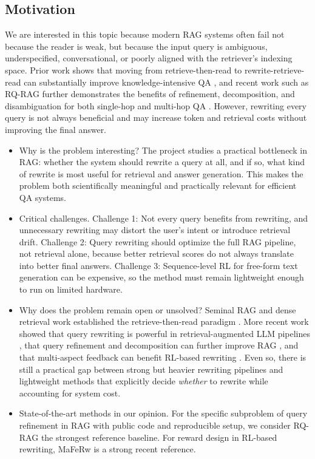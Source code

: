 \subsection{Motivation}
We are interested in this topic because modern RAG systems often fail not because the reader is weak, but because the input query is ambiguous, underspecified, conversational, or poorly aligned with the retriever's indexing space. Prior work shows that moving from retrieve-then-read to rewrite-retrieve-read can substantially improve knowledge-intensive QA \citep{ma-etal-2023-query}, and recent work such as RQ-RAG further demonstrates the benefits of refinement, decomposition, and disambiguation for both single-hop and multi-hop QA \citep{chan2024rqrag}. However, rewriting every query is not always beneficial and may increase token and retrieval costs without improving the final answer.

\begin{itemize}
    \item Why is the problem interesting? The project studies a practical bottleneck in RAG: whether the system should rewrite a query at all, and if so, what kind of rewrite is most useful for retrieval and answer generation. This makes the problem both scientifically meaningful and practically relevant for efficient QA systems.
    \item Critical challenges. Challenge 1: Not every query benefits from rewriting, and unnecessary rewriting may distort the user's intent or introduce retrieval drift. Challenge 2: Query rewriting should optimize the full RAG pipeline, not retrieval alone, because better retrieval scores do not always translate into better final answers. Challenge 3: Sequence-level RL for free-form text generation can be expensive, so the method must remain lightweight enough to run on limited hardware.
    \item Why does the problem remain open or unsolved? Seminal RAG and dense retrieval work established the retrieve-then-read paradigm \citep{lewis2020retrieval,karpukhin-etal-2020-dense}. More recent work showed that query rewriting is powerful in retrieval-augmented LLM pipelines \citep{ma-etal-2023-query}, that query refinement and decomposition can further improve RAG \citep{chan2024rqrag}, and that multi-aspect feedback can benefit RL-based rewriting \citep{wang2024maferw}. Even so, there is still a practical gap between strong but heavier rewriting pipelines and lightweight methods that explicitly decide \emph{whether} to rewrite while accounting for system cost.
    \item State-of-the-art methods in our opinion. For the specific subproblem of query refinement in RAG with public code and reproducible setup, we consider RQ-RAG \citep{chan2024rqrag} the strongest reference baseline. For reward design in RL-based rewriting, MaFeRw \citep{wang2024maferw} is a strong recent reference.
\end{itemize}
